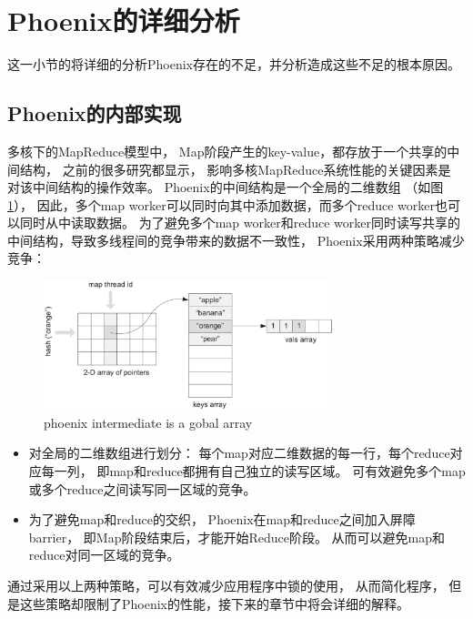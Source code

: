 \section{Phoenix的详细分析}
这一小节的将详细的分析Phoenix存在的不足，并分析造成这些不足的根本原因。

\subsection{Phoenix的内部实现}
多核下的MapReduce模型中，
Map阶段产生的key-value，都存放于一个共享的中间结构，
之前的很多研究都显示，
影响多核MapReduce系统性能的关键因素是
对该中间结构的操作效率\cite{mao2010metis}。
Phoenix的中间结构是一个全局的二维数组
（如图\ref{phoenix:intermediate}），
因此，多个map worker可以同时向其中添加数据，而多个reduce worker也可以同时从中读取数据。
为了避免多个map worker和reduce worker同时读写共享的中间结构，导致多线程间的竞争带来的数据不一致性，
Phoenix采用两种策略减少竞争：
\begin{figure}[!h!t]  
	\centering
	\includegraphics[width=0.75\textwidth]{img/phoenix_intermediate.eps}
	\caption{phoenix intermediate is a gobal array}
	\label{phoenix:intermediate}
\end{figure}

\begin{itemize}
	\item 对全局的二维数组进行划分：
	每个map对应二维数据的每一行，每个reduce对应每一列，
	即map和reduce都拥有自己独立的读写区域。
	可有效避免多个map或多个reduce之间读写同一区域的竞争。
	
	\item 为了避免map和reduce的交织，
	Phoenix在map和reduce之间加入屏障barrier，
	即Map阶段结束后，才能开始Reduce阶段。
	从而可以避免map和reduce对同一区域的竞争。
	
\end{itemize}
通过采用以上两种策略，可以有效减少应用程序中锁的使用，
从而简化程序， %
但是这些策略却限制了Phoenix的性能，接下来的章节中将会详细的解释。

